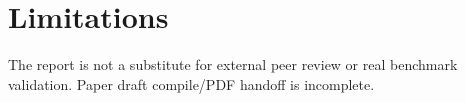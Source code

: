 \section{Limitations}
The report is not a substitute for external peer review or real benchmark validation. Paper draft compile/PDF handoff is incomplete.
